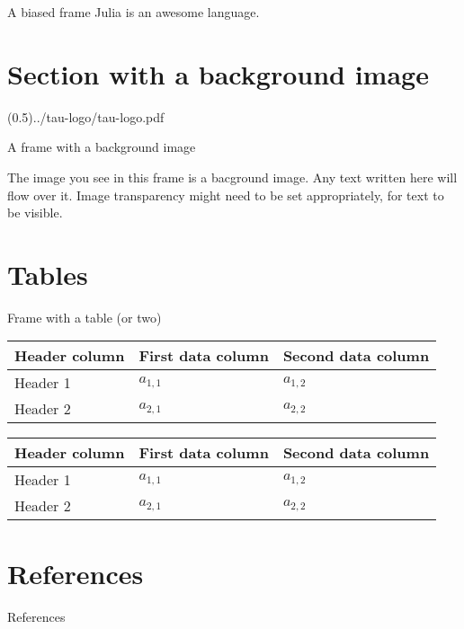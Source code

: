 \begin{frame}{A biased frame}
    Julia is an awesome language.~\cite{Bezanson--Edelman--Karpinski-2017}
\end{frame}

\section{Section with a background image}

\begingroup

\setbackgroundimage[0.5](0.5){../tau-logo/tau-logo.pdf}

\begin{frame}{A frame with a background image}

	The image you see in this frame is a bacground image. Any text written
	here will flow over it. Image transparency might need to be set
	appropriately, for text to be visible.

\end{frame}

\endgroup

\section{Tables}

\begin{frame}{Frame with a table (or two)}

\begin{center}
\begin{tabular}{l | l l }
\toprule
Header column & First data column & Second data column \\
\midrule
Header 1 & \(a_{1,1}\) & \(a_{1,2}\) \\
Header 2 & \(a_{2,1}\) & \(a_{2,2}\) \\
\bottomrule
\end{tabular}
\end{center}

\begin{center}
\begin{tabular}{l | l l }
\toprule
Header column & First data column & Second data column \\
\midrule
Header 1 & \(a_{1,1}\) & \(a_{1,2}\) \\
Header 2 & \(a_{2,1}\) & \(a_{2,2}\) \\
\bottomrule
\end{tabular}
\end{center}
\end{frame}

\section{References}

\begin{frame}{References}
    \printbibliography[heading=none]
\end{frame}


